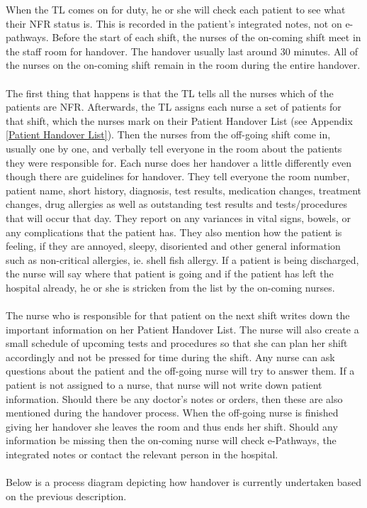 \newpage
\noindent When the TL comes on for duty, he or she will check each patient to see what their NFR status is. This is recorded in the patient's integrated notes, not on e-pathways. Before the start of each shift, the nurses of the on-coming shift meet in the staff room for handover. The handover usually last around 30 minutes. All of the nurses on the on-coming shift remain in the room during the entire handover. 
\\ \\ 
The first thing that happens is that the TL tells all the nurses which of the patients are NFR. Afterwards, the TL assigns each nurse a set of patients for that shift, which the nurses mark on their Patient Handover List (see Appendix \ref{Patient Handover List}). Then the nurses from the off-going shift come in, usually one by one, and verbally tell everyone in the room about the patients they were responsible for. Each nurse does her handover a little differently even though there are guidelines for handover. They tell everyone the room number, patient name, short history, diagnosis, test results, medication changes, treatment changes, drug allergies as well as outstanding test results and tests/procedures that will occur that day. They report on any variances in vital signs, bowels, or any complications that the patient has. They also mention how the patient is feeling, if they are annoyed, sleepy, disoriented and other general information such as non-critical allergies, ie. shell fish allergy. If a patient is being discharged, the nurse will say where that patient is going and if the patient has left the hospital already, he or she is stricken from the list by the on-coming nurses. 
\\ \\
The nurse who is responsible for that patient on the next shift writes down the important information on her Patient Handover List. The nurse will also create a small schedule of upcoming tests and procedures so that she can plan her shift accordingly and not be pressed for time during the shift. Any nurse can ask questions about the patient and the off-going nurse will try to answer them. If a patient is not assigned to a nurse, that nurse will not write down patient information. Should there be any doctor's notes or orders, then these are also mentioned during the handover process. When the off-going nurse is finished giving her handover she leaves the room and thus ends her shift. Should any information be missing then the on-coming nurse will check e-Pathways, the integrated notes or contact the relevant person in the hospital.
\\ \\
Below is a process diagram depicting how handover is currently undertaken based on the previous description.

